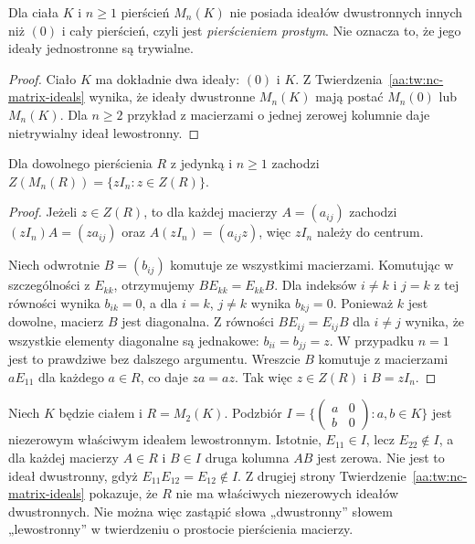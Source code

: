 \begin{wniosek}
\label{aa:wn:nc-matrix-simple}
Dla ciała $K$ i $n\ge1$ pierścień $M_n(K)$
nie posiada ideałów dwustronnych innych niż $(0)$
i cały pierścień, czyli jest \emph{pierścieniem prostym}.
Nie oznacza to, że jego ideały jednostronne są trywialne.
\end{wniosek}
\begin{proof}
Ciało $K$ ma dokładnie dwa ideały: $(0)$ i $K$.
Z Twierdzenia~\ref{aa:tw:nc-matrix-ideals} wynika,
że ideały dwustronne $M_n(K)$ mają postać
$M_n(0)$ lub $M_n(K)$. Dla $n\ge2$ przykład
z macierzami o jednej zerowej kolumnie daje
nietrywialny ideał lewostronny.
\end{proof}

\begin{twierdzenie}
\label{aa:tw:nc-matrix-center}
Dla dowolnego pierścienia $R$ z jedynką i $n\ge1$
zachodzi $Z(M_n(R))=\{zI_n:z\in Z(R)\}$.
\end{twierdzenie}
\begin{proof}
Jeżeli $z\in Z(R)$, to dla każdej macierzy
$A=(a_{ij})$ zachodzi $(zI_n)A=(za_{ij})$ oraz
$A(zI_n)=(a_{ij}z)$, więc $zI_n$ należy do centrum.

Niech odwrotnie $B=(b_{ij})$ komutuje ze wszystkimi
macierzami. Komutując w szczególności z $E_{kk}$,
otrzymujemy $BE_{kk}=E_{kk}B$. Dla indeksów
$i\ne k$ i $j=k$ z tej równości wynika $b_{ik}=0$,
a dla $i=k$, $j\ne k$ wynika $b_{kj}=0$.
Ponieważ $k$ jest dowolne, macierz $B$ jest diagonalna.
Z równości $BE_{ij}=E_{ij}B$ dla $i\ne j$ wynika,
że wszystkie elementy diagonalne są jednakowe:
$b_{ii}=b_{jj}=z$. W przypadku $n=1$ jest to
prawdziwe bez dalszego argumentu. Wreszcie $B$
komutuje z macierzami $aE_{11}$ dla każdego $a\in R$,
co daje $za=az$. Tak więc $z\in Z(R)$ i $B=zI_n$.
\end{proof}


\begin{przyklad}
\label{aa:prz:nc-matrix-one-sided-contrast}
Niech $K$ będzie ciałem i $R=M_2(K)$. Podzbiór
$I=\{\left(\begin{smallmatrix}a&0\\b&0\end{smallmatrix}\right):a,b\in K\}$
jest niezerowym właściwym ideałem lewostronnym. Istotnie,
$E_{11}\in I$, lecz $E_{22}\notin I$, a dla każdej macierzy
$A\in R$ i $B\in I$ druga kolumna $AB$ jest zerowa.
Nie jest to ideał dwustronny, gdyż $E_{11}E_{12}=E_{12}\notin I$.
Z drugiej strony Twierdzenie~\ref{aa:tw:nc-matrix-ideals} pokazuje,
że $R$ nie ma właściwych niezerowych ideałów dwustronnych.
Nie można więc zastąpić słowa „dwustronny” słowem „lewostronny”
w twierdzeniu o prostocie pierścienia macierzy.
\end{przyklad}

